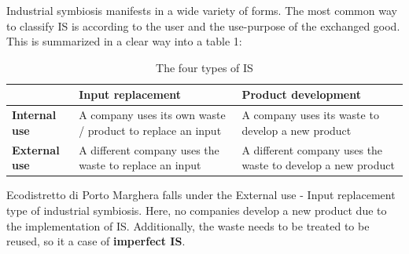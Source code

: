Industrial symbiosis manifests in a wide variety of forms. The most common way to classify IS is according to the user and the use-purpose of the exchanged good. This is summarized in a clear way into a table 1: 
           \begin{table}[H]
            \centering
            \small
            \begin{tabularx}{\linewidth}{>{\raggedright\arraybackslash}p{1.8cm} X X}
             \toprule
        & \textbf{Input replacement} & \textbf{Product development} \\
        \midrule
        \textbf{Internal use} & A company uses its own waste / product to replace an input & A company uses its waste to develop a new product \\
        \addlinespace[10pt]
        \textbf{External use} & \cellcolor{red!15} A different company uses the waste to replace an input & A different company uses the waste to develop a new product \\
        \bottomrule
            \end{tabularx}
             \caption{The four types of IS}
            \end{table}
\noindent Ecodistretto di Porto Marghera falls under the External use - Input replacement type of industrial symbiosis. Here, no companies develop a new product due to the implementation of IS. Additionally, the waste needs to be treated to be reused, so it a case of \textcolor{sapienza}{\textbf{imperfect IS}}.